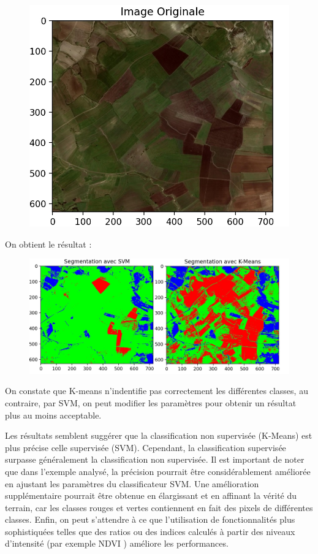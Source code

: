 \documentclass[12pt, openany]{report}
\begin{document}
\begin{figure}[H]
\centering
\includegraphics[scale=0.3]{original_assilah.jpg}
\end{figure}

On obtient le résultat : 


\begin{figure}[H]
\centering
\includegraphics[scale=0.47]{kmeans_svm.jpg}
\end{figure}

On constate que K-means n'indentifie pas correctement les différentes classes, au contraire, par SVM, on peut modifier les paramètres pour obtenir un résultat plus au moins acceptable.

Les résultats semblent suggérer que la classification non supervisée (K-Means) est plus précise celle supervisée (SVM). Cependant, la classification supervisée surpasse généralement la classification non supervisée. Il est important de noter que dans l'exemple analysé, la précision pourrait être considérablement améliorée en ajustant les paramètres du classificateur SVM. Une amélioration supplémentaire pourrait être obtenue en élargissant et en affinant la vérité du terrain, car les classes rouges et vertes contiennent en fait des pixels de différentes classes. Enfin, on peut s'attendre à ce que l'utilisation de fonctionnalités plus sophistiquées telles que des ratios ou des indices calculés à partir des niveaux d'intensité (par exemple NDVI ) améliore les performances.
\\
\end{document}
